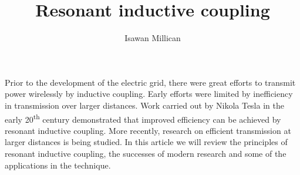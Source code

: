 \documentclass[a4paper,nobib]{tufte-handout}
\begin{document}
\title{Resonant inductive coupling}
\author{Isawan Millican}
\maketitle

Prior to the development of the electric grid,
there were great efforts to transmit power wirelessly by inductive coupling.
Early efforts were limited by inefficiency in transmission over larger distances.
Work carried out by Nikola Tesla in the early 20\textsuperscript{th} century
demonstrated that improved efficiency can be achieved by resonant inductive coupling.
More recently, research on efficient transmission at larger distances is being studied.
In this article we will review the principles of resonant inductive coupling,
the successes of modern research and some of the applications in the technique.



\printbibliography
\end{document}
